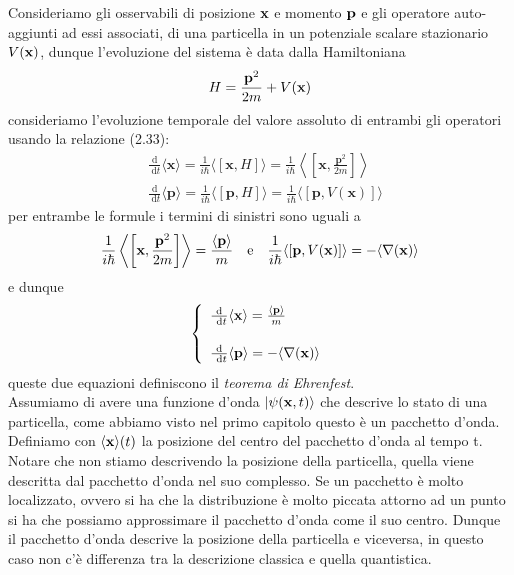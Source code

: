 Consideriamo gli osservabili di posizione $\bold{x}$ e momento $\bold{p}$ e gli operatore auto-aggiunti ad essi associati, di una particella in un potenziale scalare stazionario $V(\bold{x})$, dunque l'evoluzione del sistema \`e data dalla Hamiltoniana 
\begin{equation*}
	H = \frac{\bold{p}^2}{2m} + V(\bold{x})
\end{equation*}
consideriamo l'evoluzione temporale del valore assoluto di entrambi gli operatori usando la relazione (2.33):
\begin{equation*}
	\begin{aligned}
& \frac{\mathrm{d}}{\mathrm{~d} t}\langle\mathbf{x}\rangle=\frac{1}{i \hbar}\langle[\mathbf{x}, H]\rangle=\frac{1}{i \hbar}\left\langle\left[\mathbf{x}, \frac{\mathbf{p}^2}{2 m}\right]\right\rangle \\[0.6cm]
& \frac{\mathrm{d}}{\mathrm{~d} t}\langle\mathbf{p}\rangle=\frac{1}{i \hbar}\langle[\mathbf{p}, H]\rangle=\frac{1}{i \hbar}\langle[\mathbf{p}, V(\mathbf{x})]\rangle
\end{aligned}
\end{equation*}
per entrambe le formule i termini di sinistri sono uguali a
\begin{equation*}
	\frac{1}{i \hbar}\left\langle\left[\mathbf{x}, \frac{\mathbf{p}^2}{2 m}\right]\right\rangle = \frac{\langle \bold{p}\rangle}{m}  \quad \text{e} \quad \frac{1}{i \hbar}\langle[\mathbf{p}, V(\mathbf{x})]\rangle = -\langle \nabla(\bold{x}) \rangle 
\end{equation*}
e dunque 
\begin{equation}
	\left \{ \begin{array}{l}
		\frac{\mathrm{d}}{\mathrm{~d} t}\langle\mathbf{x}\rangle=\frac{\langle \bold{p}\rangle}{m} \\[0.5cm]
		\frac{\mathrm{d}}{\mathrm{~d} t}\langle\mathbf{p}\rangle = -\langle \nabla(\bold{x}) \rangle 
	\end{array}\right.
\end{equation}
queste due equazioni definiscono il \textit{teorema di Ehrenfest}.
\\

\noindent Assumiamo di avere una funzione d'onda $|\psi(\bold{x},t) \rangle $ che descrive lo stato di una particella, come abbiamo visto nel primo capitolo questo \`e un pacchetto d'onda. Definiamo con $\langle \bold{x} \rangle (t)$ la posizione del centro del pacchetto d'onda al tempo t. Notare che non stiamo descrivendo la posizione della particella, quella viene descritta dal pacchetto d'onda nel suo complesso. Se un pacchetto \`e molto localizzato, ovvero si ha che la distribuzione \`e molto piccata attorno ad un punto si ha che possiamo approssimare il pacchetto d'onda come il suo centro. Dunque il pacchetto d'onda descrive la posizione della particella e viceversa, in questo caso non c'\`e differenza tra la descrizione classica e quella quantistica.
\\

